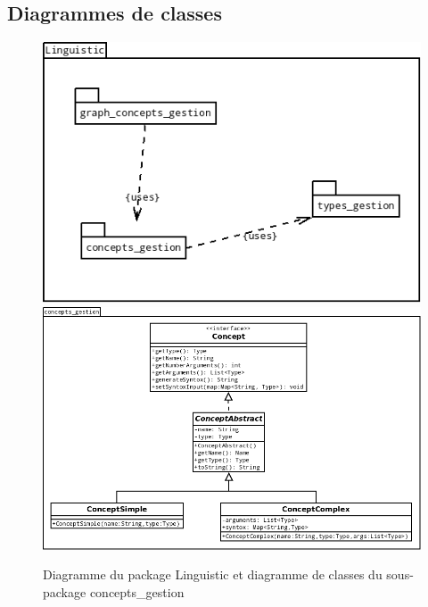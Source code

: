 \documentclass[12pt]{report}
\begin{document}
\subsection{Diagrammes de classes}

\begin{figure}[h!]
\begin{center}
\includegraphics[scale=0.5]{DiagLinguisticPackages.png}
\includegraphics[scale=0.5]{DiagLinguistic_concepts_gestion.png}
\caption{Diagramme du package Linguistic et diagramme de classes du sous-package concepts\_gestion}
\end{center}
\end{figure}
\end{document}
